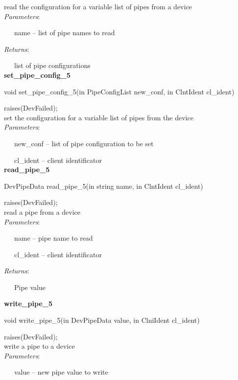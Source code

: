 read the configuration for a variable list of pipes from a device\\

\emph{Parameters}:

~~~name – list of pipe names to read

\emph{Returns}:

~~~list of pipe configurations\\

\textbf{set\_pipe\_config\_5}

void set\_pipe\_config\_5(in PipeConfigList new\_conf, in ClntIdent
cl\_ident)

raises(DevFailed);\\

set the configuration for a variable list of pipes from the device\\

\emph{Parameters}:

~~~new\_conf – list of pipe configuration to be set

~~~cl\_ident – client identificator\textbf{}\\

\textbf{read\_pipe\_5}

DevPipeData read\_pipe\_5(in string name, in ClntIdent cl\_ident)

raises(DevFailed);\\

read a pipe from a device\\

\emph{Parameters}:

~~~name – pipe name to read

~~~cl\_ident – client identificator

\emph{Returns}:

~~~Pipe value\\

\begin{flushleft}
\textbf{write\_pipe\_5}
\par\end{flushleft}

void write\_pipe\_5(in DevPipeData value, in ClniIdent cl\_ident)

raises(DevFailed);\\

write a pipe to a device\\

\emph{Parameters}:

~~~value – new pipe value to write

